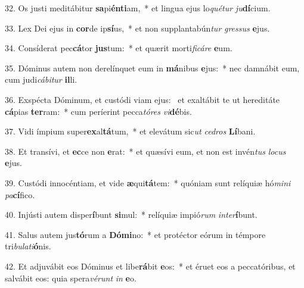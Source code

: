 32. Os justi meditábitur \textbf{sa}pi\textbf{én}\textbf{ti}am,~*  et lingua ejus lo\textit{qué}\textit{tur} \textit{ju}\textbf{dí}cium.\

33. Lex Dei ejus in \textbf{cor}de ip\textbf{sí}us,~*  et non supplantabún\textit{tur} \textit{gres}\textit{sus} \textbf{e}jus.\

34. Consíderat pec\textbf{cá}tor \textbf{jus}tum:~*  et quærit morti\textit{fi}\textit{cá}\textit{re} \textbf{e}um.\

35. Dóminus autem non derelínquet eum in \textbf{má}nibus \textbf{e}jus:~*  nec damnábit eum, cum judi\textit{cá}\textit{bi}\textit{tur} \textbf{il}li.\

36. Exspécta Dóminum, et custódi viam ejus: \dag\  et exaltábit te ut hereditáte \textbf{cá}pias \textbf{ter}ram:~*  cum períerint pecca\textit{tó}\textit{res} \textit{vi}\textbf{dé}bis.\

37. Vidi ímpium super\textbf{ex}al\textbf{tá}tum,~*  et elevátum sic\textit{ut} \textit{ce}\textit{dros} \textbf{Lí}bani.\

38. Et transívi, et \textbf{ec}ce non \textbf{e}rat:~*  et quæsívi eum, et non est invén\textit{tus} \textit{lo}\textit{cus} \textbf{e}jus.\

39. Custódi innocéntiam, et vide \textbf{æ}qui\textbf{tá}tem:~*  quóniam sunt relíquiæ hó\textit{mi}\textit{ni} \textit{pa}\textbf{cí}fico.\

40. Injústi autem disper\textbf{í}bunt \textbf{si}mul:~*  relíquiæ impió\textit{rum} \textit{in}\textit{ter}\textbf{í}bunt.\

41. Salus autem jus\textbf{tó}rum a \textbf{Dó}\textbf{mi}no:~*  et protéctor eórum in témpore tri\textit{bu}\textit{la}\textit{ti}\textbf{ó}nis.\

42. Et adjuvábit eos Dóminus et libe\textbf{rá}bit \textbf{e}os:~*  et éruet eos a peccatóribus, et salvábit eos: quia spera\textit{vé}\textit{runt} \textit{in} \textbf{e}o.\

